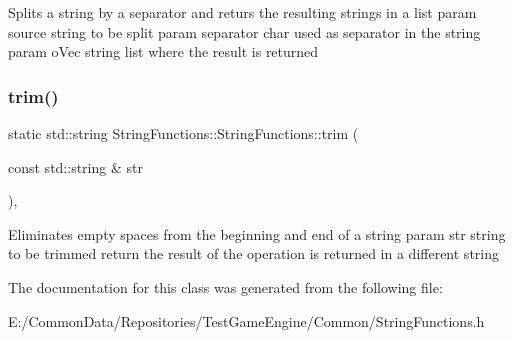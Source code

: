 Splits a string by a separator and returs the resulting strings in a list param source string to be split param separator char used as separator in the string param o\+Vec string list where the result is returned \mbox{\label{class_string_functions_1_1_string_functions_aba4b51cf55e212fb831fcf146003f35f}} 
\subsubsection{\texorpdfstring{trim()}{trim()}}
{\footnotesize\ttfamily static std\+::string String\+Functions\+::\+String\+Functions\+::trim (\begin{DoxyParamCaption}\item[{const std\+::string \&}]{str }\end{DoxyParamCaption})\hspace{0.3cm}{\ttfamily [inline]}, {\ttfamily [static]}}

Eliminates empty spaces from the beginning and end of a string param str string to be trimmed return the result of the operation is returned in a different string 

The documentation for this class was generated from the following file\+:\begin{DoxyCompactItemize}
\item 
E\+:/\+Common\+Data/\+Repositories/\+Test\+Game\+Engine/\+Common/String\+Functions.\+h\end{DoxyCompactItemize}
